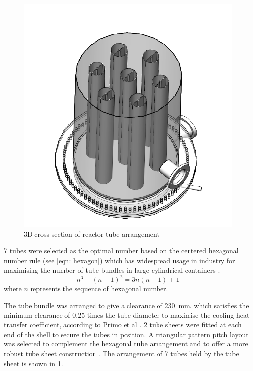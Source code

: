\begin{figure}
    \centering
    \includegraphics[width=\linewidth]{chapters/2-reaction/figures/FYD reactor 7 tubes cross section 3D.PNG}
    \caption{3D cross section of reactor tube arrangement}
    \label{fig:reactortubearrangement}
\end{figure}
7 tubes were selected as the optimal number based on the centered hexagonal number rule (see \cref{eqn: hexagon}) which has widespread usage in industry for maximising the number of tube bundles in large cylindrical containers \cite{noauthor_realiable_2018}. 
\begin{equation}
    n^3 - (n-1)^3 = 3n(n-1)+1
    \label{eqn: hexagon}
\end{equation}
where $n$ represents the sequence of hexagonal number. 

The tube bundle was arranged to give a clearance of \SI{230}{\milli \metre}, which satisfies the minimum clearance of 0.25 times the tube diameter to maximise the cooling heat transfer coefficient, according to Primo et al \cite{primo_shell_2012} . 2 tube sheets were fitted at each end of the shell to secure the tubes in position. A triangular pattern pitch layout was selected to complement the hexagonal tube arrangement and to offer a more robust tube sheet construction \cite{primo_shell_2012}. The arrangement of 7 tubes held by the tube sheet is shown in \cref{fig:reactortubearrangement}.

